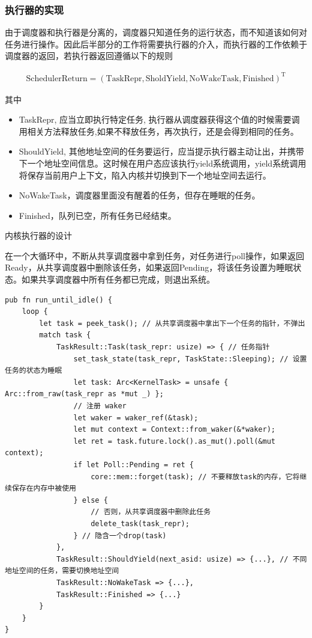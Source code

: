 \subsubsection{执行器的实现}

由于调度器和执行器是分离的，调度器只知道任务的运行状态，而不知道该如何对任务进行操作。因此后半部分的工作将需要执行器的介入，而执行器的工作依赖于调度器的返回，若执行器返回遵循以下的规则

\begin{equation}
    \label{equation:c3schedulerreturn}
    \begin{aligned}
\boldsymbol{\mathrm{SchedulerReturn}} = (\mathrm{TaskRepr}, \mathrm{SholdYield}, \mathrm{NoWakeTask}, \mathrm{Finished})^{\mathrm{T}}
    \end{aligned}
\end{equation}

其中

\begin{itemize}
    \item TaskRepr, 应当立即执行特定任务, 执行器从调度器获得这个值的时候需要调用相关方法释放任务,如果不释放任务，再次执行，还是会得到相同的任务。
    \item ShouldYield, 其他地址空间的任务要运行，应当提示执行器主动让出，并携带下一个地址空间信息。这时候在用户态应该执行yield系统调用，yield系统调用将保存当前用户上下文，陷入内核并切换到下一个地址空间去运行。
    \item  NoWakeTask，调度器里面没有醒着的任务，但存在睡眠的任务。
    \item  Finished，队列已空，所有任务已经结束。
\end{itemize}


内核执行器的设计

在一个大循环中，不断从共享调度器中拿到任务，对任务进行poll操作，如果返回Ready，从共享调度器中删除该任务，如果返回Pending，将该任务设置为睡眠状态。如果共享调度器中所有任务都已完成，则退出系统。

\begin{lstlisting}[caption=内核执行器的设计]
pub fn run_until_idle() {
    loop {
        let task = peek_task(); // 从共享调度器中拿出下一个任务的指针，不弹出
        match task {
            TaskResult::Task(task_repr: usize) => { // 任务指针
                set_task_state(task_repr, TaskState::Sleeping); // 设置任务的状态为睡眠
                let task: Arc<KernelTask> = unsafe { Arc::from_raw(task_repr as *mut _) };
                // 注册 waker
                let waker = waker_ref(&task);
                let mut context = Context::from_waker(&*waker);
                let ret = task.future.lock().as_mut().poll(&mut context);
                if let Poll::Pending = ret {
                    core::mem::forget(task); // 不要释放task的内存，它将继续保存在内存中被使用
                } else {
                    // 否则，从共享调度器中删除此任务
                    delete_task(task_repr);
                } // 隐含一个drop(task)
            },
            TaskResult::ShouldYield(next_asid: usize) => {...}, // 不同地址空间的任务，需要切换地址空间
            TaskResult::NoWakeTask => {...},
            TaskResult::Finished => {...}
        }
    }
}
\end{lstlisting}

